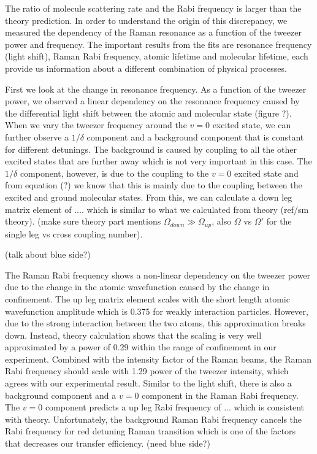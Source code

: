 \documentclass[aps,prl,twocolumn,groupedaddress]{revtex4-1}
\begin{document}
The ratio of molecule scattering rate and the Rabi frequency is larger than the theory prediction.
In order to understand the origin of this discrepancy, we measured the dependency of the Raman resonance as a function of the tweezer power and frequency. The important results from the fits are resonance frequency (light shift), Raman Rabi frequency, atomic lifetime and molecular lifetime, each provide us information about a different combination of physical processes.

First we look at the change in resonance frequency. As a function of the tweezer power, we observed a linear dependency on the resonance frequency caused by the differential light shift between the atomic and molecular state (figure ?). When we vary the tweezer frequency around the $v=0$ excited state, we can further observe a $1/\delta$ component and a background component that is constant for different detunings. The background is caused by coupling to all the other excited states that are further away which is not very important in this case. The $1/\delta$ component, however, is due to the coupling to the $v=0$ excited state and from equation (?) we know that this is mainly due to the coupling between the excited and ground molecular states. From this, we can calculate a down leg matrix element of $....$ which is similar to what we calculated from theory (ref/sm theory). (make sure theory part mentions $\Omega_{down}\gg\Omega_{up}$, also $\Omega$ vs $\Omega'$ for the single leg vs cross coupling number).

(talk about blue side?)

The Raman Rabi frequency shows a non-linear dependency on the tweezer power due to the change in the atomic wavefunction caused by the change in confinement. The up leg matrix element scales with the short length atomic wavefunction amplitude which is 0.375 for weakly interaction particles. However, due to the strong interaction between the two atoms, this approximation breaks down. Instead, theory calculation shows that the scaling is very well approximated by a power of 0.29 within the range of confinement in our experiment. Combined with the intensity factor of the Raman beams, the Raman Rabi frequency should scale with 1.29 power of the tweezer intensity, which agrees with our experimental result. Similar to the light shift, there is also a background component and a $v=0$ component in the Raman Rabi frequency. The $v=0$ component predicts a up leg Rabi frequency of $...$ which is consistent with theory. Unfortunately, the background Raman Rabi frequency cancels the Rabi frequency for red detuning Raman transition which is one of the factors that decreases our transfer efficiency. (need blue side?)
\end{document}
